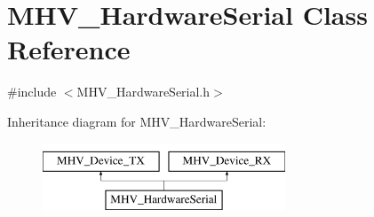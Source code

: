 \hypertarget{class_m_h_v___hardware_serial}{
\section{\-M\-H\-V\-\_\-\-Hardware\-Serial \-Class \-Reference}
\label{class_m_h_v___hardware_serial}
}


{\ttfamily \#include $<$\-M\-H\-V\-\_\-\-Hardware\-Serial.\-h$>$}

\-Inheritance diagram for \-M\-H\-V\-\_\-\-Hardware\-Serial\-:\begin{figure}[H]
\begin{center}
\leavevmode
\includegraphics[height=2.000000cm]{class_m_h_v___hardware_serial}
\end{center}
\end{figure}

